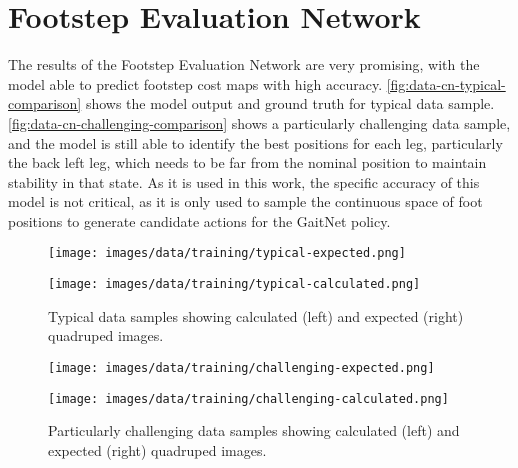 \section{Footstep Evaluation Network}

The results of the Footstep Evaluation Network are very promising,
with the model able to
predict footstep cost maps with high accuracy.
\autoref{fig:data-cn-typical-comparison}
shows the model output and ground truth for typical data sample.
\autoref{fig:data-cn-challenging-comparison}
shows a particularly challenging data sample, and the model is still
able to identify the best positions for each leg,
particularly the back left leg, which needs to be far from the
nominal position to maintain stability in that state. As it is used
in this work,
the specific accuracy of this model is not critical, as it is only used
to sample the continuous space of foot positions to generate candidate
actions for the GaitNet policy.

\begin{figure}[H]
  \centering
  \begin{minipage}[T]{0.45\textwidth}
    \centering
    \texttt{[image: images/data/training/typical-expected.png]}
  \end{minipage}
  \hfill
  \begin{minipage}[T]{0.45\textwidth}
    \centering
    \texttt{[image: images/data/training/typical-calculated.png]}
  \end{minipage}
  \hfill

  \caption{Typical data samples showing calculated (left) and
  expected (right) quadruped images.}
  \label{fig:data-cn-typical-comparison}
\end{figure}

\begin{figure}[H]
  \centering
  \begin{minipage}[T]{0.45\textwidth}
    \centering
    \texttt{[image: images/data/training/challenging-expected.png]}
  \end{minipage}
  \hfill
  \begin{minipage}[T]{0.45\textwidth}
    \centering
    \texttt{[image: images/data/training/challenging-calculated.png]}
  \end{minipage}
  \hfill

  \caption{Particularly challenging data samples showing calculated (left) and
  expected (right) quadruped images.}
  \label{fig:data-cn-challenging-comparison}
\end{figure}
